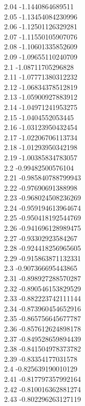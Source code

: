 {2.04	-1.1440864689511\\
2.05	-1.13454084230996\\
2.06	-1.12501126329281\\
2.07	-1.11550105907076\\
2.08	-1.10601335852609\\
2.09	-1.09655110240709\\
2.1	-1.08711705296828\\
2.11	-1.07771380312232\\
2.12	-1.06834378512819\\
2.13	-1.05900927883912\\
2.14	-1.04971241953275\\
2.15	-1.0404552053445\\
2.16	-1.03123950432454\\
2.17	-1.02206706113734\\
2.18	-1.01293950342198\\
2.19	-1.00385834783057\\
2.2	-0.99482500576104\\
2.21	-0.985840788799943\\
2.22	-0.97690691388998\\
2.23	-0.968024508236269\\
2.24	-0.959194613964674\\
2.25	-0.950418192544769\\
2.26	-0.941696128989475\\
2.27	-0.93302923584267\\
2.28	-0.924418256965605\\
2.29	-0.915863871132331\\
2.3	-0.907366695443865\\
2.31	-0.898927288570287\\
2.32	-0.890546153829529\\
2.33	-0.882223742111144\\
2.34	-0.873960454652916\\
2.35	-0.865756645677787\\
2.36	-0.857612624898178\\
2.37	-0.849528659894439\\
2.38	-0.841504978373782\\
2.39	-0.83354177031578\\
2.4	-0.825639190010129\\
2.41	-0.817797357992164\\
2.42	-0.810016362881274\\
2.43	-0.802296263127119\\
}
